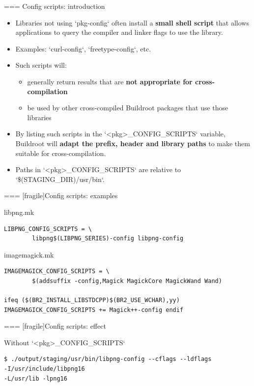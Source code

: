 === {Config scripts: introduction}
  \begin{itemize}
  \item Libraries not using `pkg-config` often install a {\bf
      small shell script} that allows applications to query the
    compiler and linker flags to use the library.
  \item Examples: `curl-config`, `freetype-config`, etc.
  \item Such scripts will:
    \begin{itemize}
    \item generally return results that are {\bf not appropriate for
        cross-compilation}
    \item be used by other cross-compiled Buildroot packages that use
      those libraries
    \end{itemize}
  \item By listing such scripts in the `<pkg>_CONFIG_SCRIPTS`
    variable, Buildroot will {\bf adapt the prefix, header and library
      paths} to make them suitable for cross-compilation.
  \item Paths in `<pkg>_CONFIG_SCRIPTS` are relative to
    `\$(STAGING_DIR)/usr/bin`.
  \end{itemize}


=== [fragile]{Config scripts: examples}

  \begin{block}{libpng.mk}
    \begin{verbatim}
LIBPNG_CONFIG_SCRIPTS = \
        libpng$(LIBPNG_SERIES)-config libpng-config
    \end{verbatim}
  \end{block}

\begin{block}{imagemagick.mk}
  \begin{verbatim}
IMAGEMAGICK_CONFIG_SCRIPTS = \
        $(addsuffix -config,Magick MagickCore MagickWand Wand)

ifeq ($(BR2_INSTALL_LIBSTDCPP)$(BR2_USE_WCHAR),yy)
IMAGEMAGICK_CONFIG_SCRIPTS += Magick++-config endif
\end{verbatim}
\end{block}



=== [fragile]{Config scripts: effect}

\begin{block}{Without `<pkg>_CONFIG_SCRIPTS`}
{\footnotesize
  \begin{verbatim}
$ ./output/staging/usr/bin/libpng-config --cflags --ldflags
-I/usr/include/libpng16
-L/usr/lib -lpng16
  \end{verbatim}}
\end{block}

